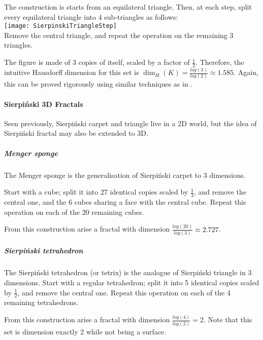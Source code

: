 The construction is starts from an equilateral triangle.
Then, at each step, split every equilateral triangle into 4 sub-triangles as follows:\\
\texttt{[image: SierpinskiTriangleStep]}\\
Remove the central triangle, and repeat the operation on the remaining 3 triangles.

The figure is made of $3$ copies of itself, scaled by a factor of $\frac{1}{2}$.
Therefore, the intuitive Hausdorff dimension for this set is $\dim_H(K) = \frac{log(3)}{log(2)} \approx 1.585$.
Again, this can be proved rigorously using similar techniques as in \cite[p. 34-35, ex. 2.7]{Falconer_1990}.

\paragraph{Sierpiński 3D Fractals}
Seen previously, Sierpiński carpet and triangle live in a 2D world, but the idea of Sierpiński fractal may also be extended to 3D.

\subparagraph{Menger sponge}
The Menger sponge is the generalisation of Sierpiński carpet to 3 dimensions.

Start with a cube; split it into 27 identical copies scaled by $\frac{1}{3}$, and remove the central one, and the 6 cubes sharing a face with the central cube.
Repeat this operation on each of the 20 remaining cubes.

From this construction arise a fractal with dimension $\frac{log(20)}{log(3)} \approx 2.727$.

\subparagraph{Sierpiński tetrahedron}
The Sierpiński tetrahedron (or tetrix) is the analogue of Sierpiński triangle in 3 dimensions.
Start with a regular tetrahedron; split it into 5 identical copies scaled by $\frac{1}{2}$, and remove the central one.
Repeat this operation on each of the 4 remaining tetrahedrons.

From this construction arise a fractal with dimension $\frac{log(4)}{log(2)} = 2$.
Note that this set is dimension exactly 2 while not being a surface.

